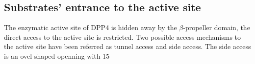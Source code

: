\subsection{Substrates' entrance to the active site}

The enzymatic active site of DPP4 is hidden away by the $\beta$-propeller domain, the direct access to the active site is restricted. Two possible access mechanisms to the active site have been referred as tunnel access and side access. The side access is an ovel shaped openning with 15